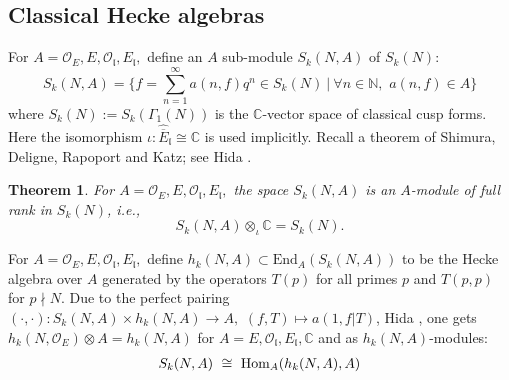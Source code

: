 \documentclass[11pt]{amsart}
\newtheorem{theorem}{Theorem}[section]
\newcommand{\C}{\mathbb C}
\begin{document}
\subsection{Classical Hecke algebras} For $A= \mathcal{O}_E, E, \mathcal{O}_\mathfrak{l}, E_\mathfrak{l},$ define an $A$ sub-module $S_k({N}, A)$ of $S_k(N)$: 
$$
S_k({N},  A) = \{ f = \sum_{n=1}^\infty a(n, f) q^n \in S_k(N) \ |\ \forall n \in \mathbb{N}, \,\, a(n,f) \in A\}
$$ 
where $S_k({N}) := S_k(\Gamma_1(N))$ is the $\C$-vector space of classical cusp forms. Here the isomorphism $\iota : \hat{\overline{E}}_\mathfrak{l} \cong \mathbb{C}$ is used implicitly.  
Recall a theorem of Shimura, Deligne, Rapoport and Katz; see Hida \cite[Chap.\,3]{mfg}.
\begin{theorem}
	For $A= \mathcal{O}_E, E, \mathcal{O}_\mathfrak{l}, E_\mathfrak{l},$ the space $S_k({N},A)$ is an $A$-module of full rank in $S_k({N})$, i.e.,
	\begin{equation}
		S_k({N},  A) \otimes_{\iota} \mathbb{C} = S_k({N}). \label{eqn: functorial-cusp-forms}
	\end{equation}
\end{theorem}
 For $A = \mathcal{O}_E, E, \mathcal{O}_\mathfrak{l}, E_\mathfrak{l},$ define $h_k({N}, A) \subset \text{End}_{A}(S_k({N}, A))$ 
 to be the Hecke algebra over $A$ generated by the operators $T(p)$ for all primes $p$ and $T(p,p)$ for $p \nmid N.$ 
 Due to the perfect pairing $( \cdot , \cdot ): S_k(N,A) \times h_k(N,A) \rightarrow A,\,\, (f,T) \mapsto a(1,f|T)$, Hida \cite[Thm.\,3.17]{mfg},  
 one gets $h_k({N}, \mathcal{O}_E) \otimes A = h_k({N}, A)$ for $A = E, \mathcal{O}_\mathfrak{l}, E_\mathfrak{l}, \mathbb{C}$ and
 as $h_k(N,A)$-modules:
\begin{gather}
	 S_k(N,A) \ \cong \ \textup{Hom}_{A}(h_k(N,A) , A) 
 \label{eqn: duality-between-hecke-algebras-and-cusp-forms}
\end{gather}
\end{document}
